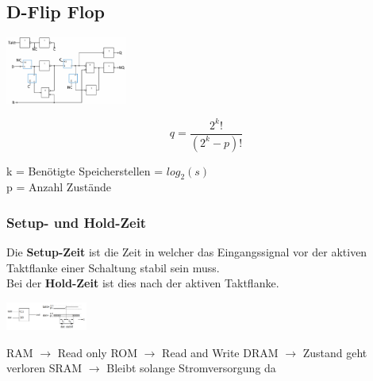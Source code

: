 \documentclass[10pt]{article}
\begin{document}
\subsection{D-Flip Flop}
\begin{center}
    \includegraphics[width=0.3\textwidth]{DFlipFlop.PNG}
\end{center}
\newpage
\begin{multicols}{2}
    \begin{equation}
    q = \frac{2^k!}{(2^k - p)!}
    \end{equation}
    \begin{center}
    k = Benötigte Speicherstellen = $log_2(s)$ \\
p = Anzahl Zustände
\end{center}
\columnbreak
\subsubsection{Setup- und Hold-Zeit}
Die \textbf{Setup-Zeit} ist die Zeit in welcher das Eingangssignal vor der aktiven Taktflanke einer Schaltung stabil sein muss. \\
Bei der \textbf{Hold-Zeit} ist dies nach der aktiven Taktflanke.
\begin{center}
    \includegraphics[width=0.2\textwidth]{Setup-HoldTime.PNG}
\end{center}
\end{multicols}
RAM $\rightarrow$ Read only ROM $\rightarrow$ Read and Write DRAM $\rightarrow$ Zustand geht verloren SRAM $\rightarrow$ Bleibt solange Stromversorgung da
\end{document}
